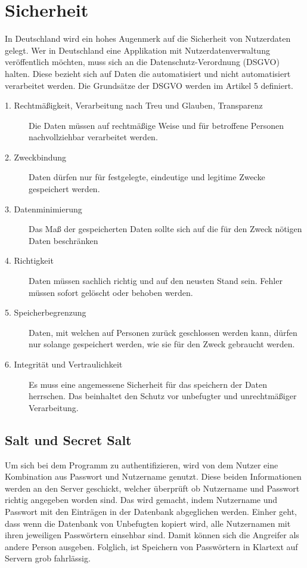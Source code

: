 \section{Sicherheit}
In Deutschland wird ein hohes Augenmerk auf die Sicherheit von Nutzerdaten gelegt. Wer in Deutschland eine Applikation mit Nutzerdatenverwaltung veröffentlich möchten, muss sich an die Datenschutz-Verordnung (DSGVO) halten. Diese bezieht sich auf Daten die automatisiert und nicht automatisiert verarbeitet werden. Die Grundsätze der DSGVO werden im Artikel 5 definiert.
\begin{description}
\item[1. Rechtmäßigkeit, Verarbeitung nach Treu und Glauben, Transparenz]
Die Daten müssen auf rechtmäßige Weise und für betroffene Personen nachvollziehbar verarbeitet werden.
\item[2. Zweckbindung]
Daten dürfen nur für festgelegte, eindeutige und legitime Zwecke gespeichert werden.
\item[3. Datenminimierung]
Das Maß der gespeicherten Daten sollte sich auf die für den Zweck nötigen Daten beschränken
\item[4. Richtigkeit]
Daten müssen sachlich richtig und auf den neusten Stand sein. Fehler müssen sofort gelöscht oder behoben werden.
\item[5. Speicherbegrenzung]
Daten, mit welchen auf Personen zurück geschlossen werden kann, dürfen nur solange gespeichert werden, wie sie für den Zweck gebraucht werden.
\item[6. Integrität und Vertraulichkeit]
Es muss eine angemessene Sicherheit für das speichern der Daten herrschen. Das beinhaltet den Schutz vor unbefugter und unrechtmäßiger Verarbeitung.
\end{description}

\subsection{Salt und Secret Salt}
Um sich bei dem Programm zu authentifizieren, wird von dem Nutzer eine Kombination aus Passwort und Nutzername genutzt. Diese beiden Informationen werden an den Server geschickt, welcher überprüft ob Nutzername und Passwort richtig angegeben worden sind. Das wird gemacht, indem Nutzername und Passwort mit den Einträgen in der Datenbank abgeglichen werden. Einher geht, dass wenn die Datenbank von Unbefugten kopiert wird, alle Nutzernamen mit ihren jeweiligen Passwörtern einsehbar sind. Damit können sich die Angreifer als andere Person ausgeben. Folglich, ist Speichern von Passwörtern in Klartext auf Servern grob fahrlässig.

